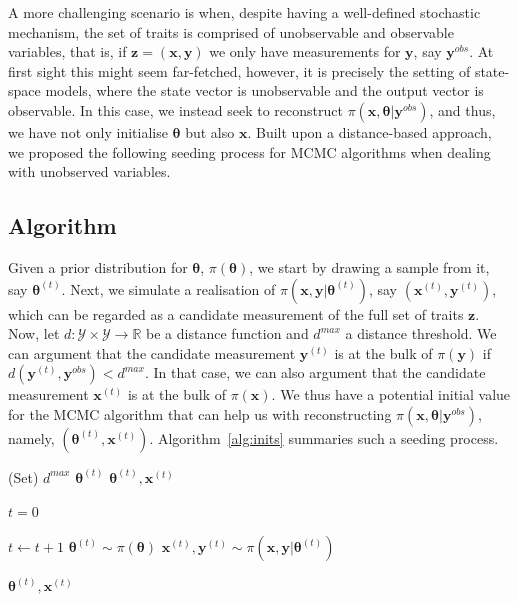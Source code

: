 \documentclass[12pt,a4paper]{article}
\begin{document}
A more challenging scenario is when, despite having a well-defined stochastic mechanism, the set of traits is comprised of unobservable and observable variables, that is, if $\mathbf{z} = (\mathbf{x}, \mathbf{y})$ we only have measurements for $\mathbf{y}$, say $\mathbf{y}^{obs}$. At first sight this might seem far-fetched, however, it is precisely the setting of state-space models, where the state vector is unobservable and the output vector is observable. In this case, we instead seek to reconstruct $\pi(\mathbf{x}, \boldsymbol{\theta} \vert \mathbf{y}^{obs})$, and thus, we have not only initialise $\boldsymbol{\theta}$ but also $\mathbf{x}$. Built upon a distance-based approach, we proposed the following seeding process for MCMC algorithms when dealing with unobserved variables.

\subsection{Algorithm}

Given a prior distribution for $\boldsymbol{\theta}$, $\pi(\boldsymbol{\theta})$, we start by drawing a sample from it, say $\boldsymbol{\theta}^{(t)}$. Next, we simulate a realisation of $\pi(\mathbf{x}, \mathbf{y} \vert \boldsymbol{\theta}^{(t)})$, say $(\mathbf{x}^{(t)}, \mathbf{y}^{(t)})$, which can be regarded as a candidate measurement of the full set of traits $\mathbf{z}$. Now, let $d:\mathcal{Y}\times\mathcal{Y}\rightarrow\mathbb{R}$ be a distance function and $d^{max}$ a distance threshold. We can argument that the candidate measurement $\mathbf{y}^{(t)}$ is at the bulk of $\pi(\mathbf{y})$ if $d(\mathbf{y}^{(t)}, \mathbf{y}^{obs}) < d^{max}$. In that case, we can also argument that the candidate measurement $\mathbf{x}^{(t)}$ is at the bulk of $\pi(\mathbf{x})$. We thus have a potential initial value for the MCMC algorithm that can help us with reconstructing $\pi(\mathbf{x}, \boldsymbol{\theta} \vert \mathbf{y}^{obs})$, namely, $(\boldsymbol{\theta}^{(t)}, \mathbf{x}^{(t)})$. Algorithm~\ref{alg:inits} summaries such a seeding process.

\begin{algorithm}
\caption{Distance-based seeding process}
\label{alg:inits}
\begin{algorithmic}[1]

\Require (Set) $d^{max}$
\Require $\boldsymbol{\theta}^{(t)}$
\Ensure $\boldsymbol{\theta}^{(t)}, \mathbf{x}^{(t)}$

\State $t = 0$

\Repeat
	\State $t \leftarrow t+1$
	\State $\boldsymbol{\theta}^{(t)} \sim \pi(\boldsymbol{\theta})$
    \State $\mathbf{x}^{(t)}, \mathbf{y}^{(t)} \sim \pi(\mathbf{x}, \mathbf{y} \vert \boldsymbol{\theta}^{(t)})$
    

\Return $\boldsymbol{\theta}^{(t)}, \mathbf{x}^{(t)}$

\end{algorithmic}
\end{algorithm}
\end{document}
